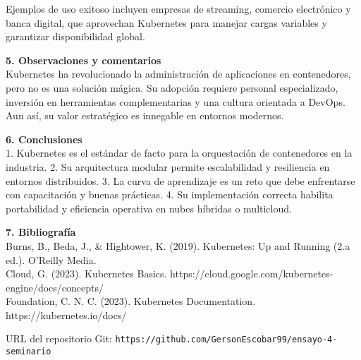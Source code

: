 \documentclass[12pt]{article}
\begin{document}
Ejemplos de uso exitoso incluyen empresas de streaming, comercio electrónico y banca digital, que aprovechan Kubernetes para manejar cargas variables y garantizar disponibilidad global.

\textbf{5. Observaciones y comentarios}  
\\
Kubernetes ha revolucionado la administración de aplicaciones en contenedores, pero no es una solución mágica. Su adopción requiere personal especializado, inversión en herramientas complementarias y una cultura orientada a DevOps. Aun así, su valor estratégico es innegable en entornos modernos.

\textbf{6. Conclusiones}  
\\
1. Kubernetes es el estándar de facto para la orquestación de contenedores en la industria.  
2. Su arquitectura modular permite escalabilidad y resiliencia en entornos distribuidos.  
3. La curva de aprendizaje es un reto que debe enfrentarse con capacitación y buenas prácticas.  
4. Su implementación correcta habilita portabilidad y eficiencia operativa en nubes híbridas o multicloud.  

\textbf{7. Bibliografía}  
\\
Burns, B., Beda, J., & Hightower, K. (2019). Kubernetes: Up and Running (2.a ed.). O’Reilly Media.
\\
Cloud, G. (2023). Kubernetes Basics. https://cloud.google.com/kubernetes-engine/docs/concepts/
\\
Foundation, C. N. C. (2023). Kubernetes Documentation. https://kubernetes.io/docs/


\vspace{0.5cm}
\noindent URL del repositorio Git: \texttt{https://github.com/GersonEscobar99/ensayo-4-seminario}
\end{document}
